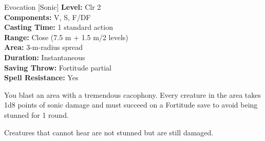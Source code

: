 {Evocation [Sonic]}
{
	\textbf{Level:}
	Clr 2\\
	\textbf{Components:}
	V, S, F/DF\\
	\textbf{Casting Time:}
	1 standard action\\
	\textbf{Range:}
	Close (7.5 m + 1.5 m/2 levels)\\
	\textbf{Area:}
	3-m-radius spread\\
	\textbf{Duration:}
	Instantaneous\\
	\textbf{Saving Throw:}
	Fortitude partial\\
	\textbf{Spell Resistance:}
	Yes\\
}
{
	You blast an area with a tremendous cacophony. Every creature in the area takes 1d8 points of sonic damage and must succeed on a Fortitude save to avoid being stunned for 1 round.

	Creatures that cannot hear are not stunned but are still damaged.

}

